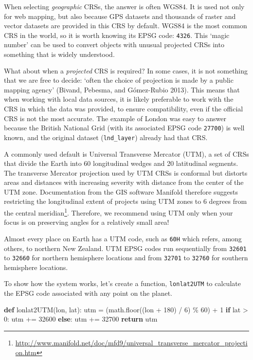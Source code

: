 \documentclass[
  letterpaper,
]{krantz}
\newenvironment{Shaded}{\begin{snugshade}}{\end{snugshade}}
\newcommand{\ControlFlowTok}[1]{\textcolor[rgb]{0.00,0.23,0.31}{\textbf{#1}}}
\newcommand{\DecValTok}[1]{\textcolor[rgb]{0.68,0.00,0.00}{#1}}
\newcommand{\KeywordTok}[1]{\textcolor[rgb]{0.00,0.23,0.31}{\textbf{#1}}}
\newcommand{\NormalTok}[1]{\textcolor[rgb]{0.00,0.23,0.31}{#1}}
\newcommand{\OperatorTok}[1]{\textcolor[rgb]{0.37,0.37,0.37}{#1}}
\begin{document}
When selecting \emph{geographic} CRSs, the answer is often WGS84. It is
used not only for web mapping, but also because GPS datasets and
thousands of raster and vector datasets are provided in this CRS by
default. WGS84 is the most common CRS in the world, so it is worth
knowing its EPSG code: \texttt{4326}. This `magic number' can be used to
convert objects with unusual projected CRSs into something that is
widely understood.

What about when a \emph{projected} CRS is required? In some cases, it is
not something that we are free to decide: `often the choice of
projection is made by a public mapping agency' (Bivand, Pebesma, and
Gómez-Rubio 2013). This means that when working with local data sources,
it is likely preferable to work with the CRS in which the data was
provided, to ensure compatibility, even if the official CRS is not the
most accurate. The example of London was easy to answer because the
British National Grid (with its associated EPSG code \texttt{27700}) is
well known, and the original dataset (\texttt{lnd\_layer}) already had
that CRS.

A commonly used default is Universal Transverse Mercator (UTM), a set of
CRSs that divide the Earth into 60 longitudinal wedges and 20
latitudinal segments. The transverse Mercator projection used by UTM
CRSs is conformal but distorts areas and distances with increasing
severity with distance from the center of the UTM zone. Documentation
from the GIS software Manifold therefore suggests restricting the
longitudinal extent of projects using UTM zones to 6 degrees from the
central meridian\footnote{\url{http://www.manifold.net/doc/mfd9/universal_transverse_mercator_projection.htm}}.
Therefore, we recommend using UTM only when your focus is on preserving
angles for a relatively small area!

Almost every place on Earth has a UTM code, such as
\texttt{\textquotesingle{}60H\textquotesingle{}} which refers, among
others, to northern New Zealand. UTM EPSG codes run sequentially from
\texttt{32601} to \texttt{32660} for northern hemisphere locations and
from \texttt{32701} to \texttt{32760} for southern hemisphere locations.

To show how the system works, let's create a function,
\texttt{lonlat2UTM} to calculate the EPSG code associated with any point
on the planet.

\begin{Shaded}
\begin{Highlighting}[]
\KeywordTok{def}\NormalTok{ lonlat2UTM(lon, lat):}
\NormalTok{    utm }\OperatorTok{=}\NormalTok{ (math.floor((lon }\OperatorTok{+} \DecValTok{180}\NormalTok{) }\OperatorTok{/} \DecValTok{6}\NormalTok{) }\OperatorTok{\%} \DecValTok{60}\NormalTok{) }\OperatorTok{+} \DecValTok{1}
    \ControlFlowTok{if}\NormalTok{ lat }\OperatorTok{\textgreater{}} \DecValTok{0}\NormalTok{:}
\NormalTok{        utm }\OperatorTok{+=} \DecValTok{32600}
    \ControlFlowTok{else}\NormalTok{:}
\NormalTok{        utm }\OperatorTok{+=} \DecValTok{32700}
    \ControlFlowTok{return}\NormalTok{ utm}
\end{Highlighting}
\end{Shaded}
\end{document}
